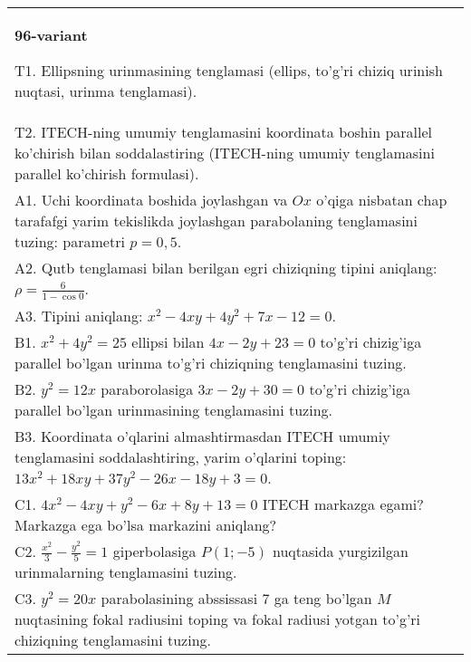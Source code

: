 \documentclass{article}
\begin{document}
\begin{tabular}{m{17cm}}
\textbf{96-variant}
\newline

T1. Ellipsning urinmasining tenglamasi (ellips, to'g'ri chiziq urinish nuqtasi, urinma tenglamasi).\\

T2. ITECH-ning umumiy tenglamasini koordinata boshin parallel ko'chirish bilan soddalastiring (ITECH-ning umumiy tenglamasini parallel ko'chirish formulasi).\\

A1. Uchi koordinata boshida joylashgan va $Ox$ o'qiga nisbatan chap tarafafgi yarim tekislikda joylashgan parabolaning tenglamasini tuzing: parametri $p=0,5$.\\

A2. Qutb tenglamasi bilan berilgan egri chiziqning tipini aniqlang: $\rho=\frac{6}{1-\cos 0}$.\\

A3. Tipini aniqlang: $x^{2}-4xy+4y^{2}+7x-12=0$.\\

B1. $x^{2} + 4y^{2} = 25$ ellipsi bilan $4x - 2y + 23 = 0$ to'g'ri chizig'iga parallel bo'lgan urinma to'g'ri chiziqning tenglamasini tuzing.  \\

B2. $y^{2} = 12x$ paraborolasiga $3x - 2y + 30 = 0$ to'g'ri chizig'iga parallel bo'lgan urinmasining tenglamasini tuzing.  \\

B3. Koordinata o'qlarini almashtirmasdan ITECH umumiy tenglamasini soddalashtiring, yarim o'qlarini toping: $13x^{2} + 18xy + 37y^{2} - 26x - 18y + 3 = 0$.  \\

C1. $4x^{2} - 4xy + y^{2} - 6x + 8y + 13 = 0$ ITECH markazga egami? Markazga ega bo'lsa markazini aniqlang?  \\

C2. $\frac{x^{2}}{3} - \frac{y^{2}}{5} = 1$ giperbolasiga $P(1; - 5)$ nuqtasida yurgizilgan urinmalarning tenglamasini tuzing.\\

C3. $y^{2} = 20x$ parabolasining abssissasi 7 ga teng bo'lgan $M$ nuqtasining fokal radiusini toping va fokal radiusi yotgan to'g'ri chiziqning tenglamasini tuzing.  \\

\end{tabular}
\vspace{1cm}
\end{document}
